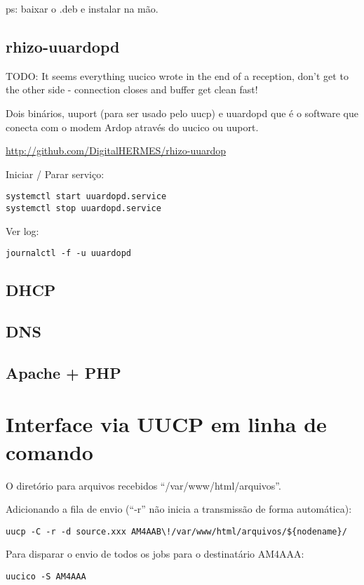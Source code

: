 \documentclass[11pt,a4paper]{article}
\begin{document}
ps: baixar o .deb e instalar na mão.

\subsection{rhizo-uuardopd}

TODO: It seems everything uucico wrote in the end of a reception, don't get
to the other side - connection closes and buffer get clean fast!

Dois binários, uuport (para ser usado pelo uucp) e uuardopd que é o software
que conecta com o modem Ardop através do uucico ou uuport.

\url{http://github.com/DigitalHERMES/rhizo-uuardop}


Iniciar / Parar serviço:
\begin{verbatim}
systemctl start uuardopd.service
systemctl stop uuardopd.service
\end{verbatim}


Ver log:
\begin{verbatim}
journalctl -f -u uuardopd
\end{verbatim}

\subsection{DHCP}

\subsection{DNS}

\subsection{Apache + PHP}

\section{Interface via UUCP em linha de comando}

O diretório para arquivos recebidos ``/var/www/html/arquivos''.

Adicionando a fila de envio (``-r'' não inicia a transmissão de forma
automática):
\begin{verbatim}
uucp -C -r -d source.xxx AM4AAB\!/var/www/html/arquivos/${nodename}/
\end{verbatim}

Para disparar o envio de todos os jobs para o destinatário
AM4AAA:
\begin{verbatim}
uucico -S AM4AAA
\end{verbatim}
\end{document}
